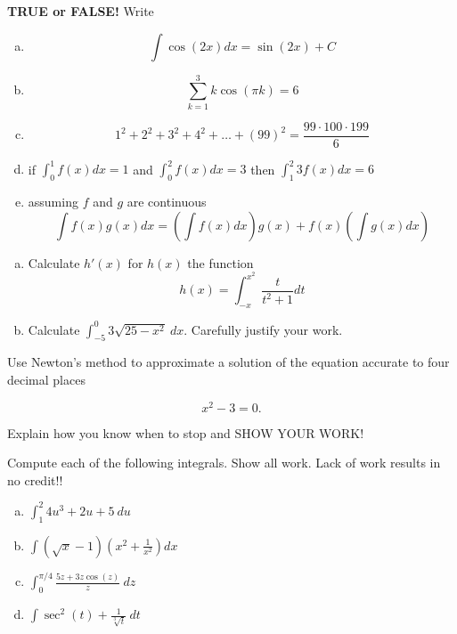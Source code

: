 \documentclass[11pt]{exam}
\theoremstyle{definition}
\begin{document}
\begin{questions}

\addpoints

\question[10]\mbox{}
\textbf{TRUE or FALSE!}  Write 
\begin{enumerate}[(a)]
\item  $$\int \cos(2x)dx = \sin(2x) + C$$
\vspace{1.2in}
\item  $$\sum_{k=1}^3 k\cos(\pi k) = 6$$
\vspace{1.2in}
\item  $$1^2 + 2^2 + 3^2 + 4^2 + \dots + (99)^2 = \frac{99\cdot 100\cdot 199}{6}$$
\vspace{1.2in}
\item  if $\int_0^1 f(x)dx = 1$ and $\int_0^2 f(x)dx = 3$ then $\int_1^2 3f(x) dx = 6$
\vspace{1.2in}
\item  assuming $f$ and $g$ are continuous
$$\int f(x)g(x)dx = \left(\int f(x)dx\right)g(x) + f(x)\left(\int g(x)dx\right)$$
\vspace{1.2in}
\end{enumerate}

\newpage
\question[10]\mbox{}
\begin{enumerate}[(a)]
\item  Calculate $h'(x)$ for $h(x)$ the function
$$h(x) = \int_{-x}^{x^2} \frac{t}{t^2+1} dt$$
\vspace{3in}
\item  Calculate $\int_{-5}^0 3\sqrt{25-x^2}\ dx$.  Carefully justify your work.
\end{enumerate}

\newpage
\question[10]\mbox{}
Use Newton's method to approximate a solution of the equation accurate to four decimal places

$$x^2 - 3 = 0.$$

Explain how you know when to stop and SHOW YOUR WORK!


\newpage
\question[10]\mbox{}
Compute each of the following integrals.  Show all work.
Lack of work results in no credit!!
\begin{enumerate}[(a)]
\item $\int_1^2 4u^3 + 2u + 5\ du$
\vspace{2in}
\item $\int (\sqrt{x}-1)\left(x^2+\frac{1}{x^2}\right) dx$
\vspace{2in}
\item $\int_0^{\pi/4} \frac{5z + 3z\cos(z)}{z}\ dz$
\vspace{2in}
\item $\int \sec^2(t) + \frac{1}{\sqrt[3]{t}}\ dt$
\end{enumerate}


\end{questions}
\end{document}
